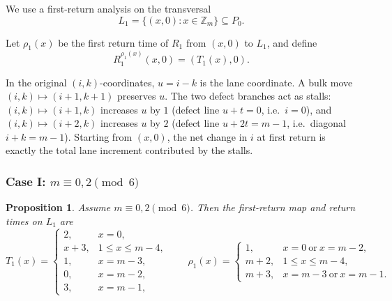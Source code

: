\documentclass[11pt]{article}
\newtheorem{proposition}{Proposition}
\newcommand{\Zm}{\mathbb Z_m}
\begin{document}
We use a first-return analysis on the transversal
\[
L_1=\{(x,0):x\in \Zm\}\subseteq P_0.
\]

Let $\rho_1(x)$ be the first return time of $R_1$ from $(x,0)$ to $L_1$, and define
\[
R_1^{\rho_1(x)}(x,0)=(T_1(x),0).
\]

In the original $(i,k)$-coordinates, $u=i-k$ is the lane coordinate.
A bulk move $(i,k)\mapsto(i+1,k+1)$ preserves $u$.
The two defect branches act as stalls: $(i,k)\mapsto(i+1,k)$ increases $u$ by $1$ (defect line $u+t=0$, i.e.\ $i=0$), and $(i,k)\mapsto(i+2,k)$ increases $u$ by $2$ (defect line $u+2t=m-1$, i.e.\ diagonal $i+k=m-1$).
Starting from $(x,0)$, the net change in $i$ at first return is exactly the total lane increment contributed by the stalls.

\subsubsection{Case I: $m\equiv 0,2\pmod 6$}

\begin{proposition}\label{prop:R1-caseI}
Assume $m\equiv 0,2\pmod 6$.
Then the first-return map and return times on $L_1$ are
\[
T_1(x)=
\begin{cases}
2,&x=0,\\
x+3,&1\le x\le m-4,\\
1,&x=m-3,\\
0,&x=m-2,\\
3,&x=m-1,
\end{cases}
\qquad
\rho_1(x)=
\begin{cases}
1,&x=0\ \text{or}\ x=m-2,\\
m+2,&1\le x\le m-4,\\
m+3,&x=m-3\ \text{or}\ x=m-1.
\end{cases}
\]
\end{proposition}
\end{document}
